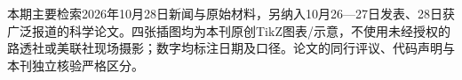 \documentclass[10pt]{article}
\begin{document}
\begin{documents}
\par{}\par
{\scriptsize 本期主要检索2026年10月28日新闻与原始材料，另纳入10月26—27日发表、28日获广泛报道的科学论文。四张插图均为本刊原创TikZ图表/示意，不使用未经授权的路透社或美联社现场摄影；数字均标注日期及口径。论文的同行评议、代码声明与本刊独立核验严格区分。}\par
\begingroup\fontsize{6}{7.1}\selectfont
\renewcommand{\refname}{参考文献}

\endgroup
\end{documents}
\end{document}
